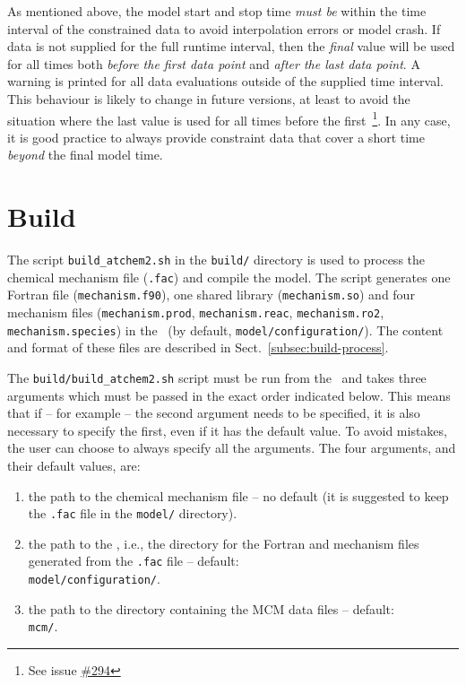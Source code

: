 As mentioned above, the model start and stop time \emph{must be}
within the time interval of the constrained data to avoid
interpolation errors or model crash. If data is not supplied for the
full runtime interval, then the \emph{final} value will be used for
all times both \emph{before the first data point} and \emph{after the
  last data point}. A warning is printed for all data evaluations
outside of the supplied time interval. This behaviour is likely to
change in future versions, at least to avoid the situation where the
last value is used for all times before the first~\footnote{See issue
\href{https://github.com/AtChem/AtChem2/issues/294}{\#294}}. In any
case, it is good practice to always provide constraint data that cover
a short time \emph{beyond} the final model time.

\section{Build} \label{sec:build}

The script \texttt{build\_atchem2.sh} in the \texttt{build/} directory
is used to process the chemical mechanism file (\texttt{.fac}) and
compile the model. The script generates one Fortran file
(\texttt{mechanism.f90}), one shared library (\texttt{mechanism.so})
and four mechanism files (\texttt{mechanism.prod},
\texttt{mechanism.reac}, \texttt{mechanism.ro2},
\texttt{mechanism.species}) in the \sharedir\ (by default, \texttt{model/configuration/}).
The content and format of these files are described in Sect.~\ref{subsec:build-process}.

The \texttt{build/build\_atchem2.sh} script must be run from the
\maindir\ and takes three arguments which must be passed in the exact
order indicated below. This means that if -- for example -- the second
argument needs to be specified, it is also necessary to specify the
first, even if it has the default value. To avoid mistakes, the user
can choose to always specify all the arguments. The four arguments,
and their default values, are:

\begin{enumerate}
\item the path to the chemical mechanism file -- no default
  (it is suggested to keep the \texttt{.fac} file in the \texttt{model/} directory).
\item the path to the \sharedir, i.e., the directory for the Fortran and mechanism files
  generated from the \texttt{.fac} file -- default:\\
  \texttt{model/configuration/}.
\item the path to the directory containing the MCM data files -- default:\\
  \texttt{mcm/}.
\end{enumerate}

